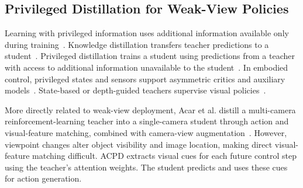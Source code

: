 

\subsection{Privileged Distillation for Weak-View Policies}

Learning with privileged information uses additional information available only during training~\cite{vapnik2015lupi}. Knowledge distillation transfers teacher predictions to a student~\cite{hinton2015distilling}. Privileged distillation trains a student using predictions from a teacher with access to additional information unavailable to the student~\cite{lopezpaz2016generalized}. In embodied control, privileged states and sensors support asymmetric critics and auxiliary models~\cite{pinto2018asymmetric,hu2024scaffolder}. State-based or depth-guided teachers supervise visual policies~\cite{xu2024humanvla,wang2025monolift}.

More directly related to weak-view deployment, Acar et al. distill a multi-camera reinforcement-learning teacher into a single-camera student through action and visual-feature matching, combined with camera-view augmentation~\cite{acar2024multicamera}. However, viewpoint changes alter object visibility and image location, making direct visual-feature matching difficult. ACPD extracts visual cues for each future control step using the teacher's attention weights. The student predicts and uses these cues for action generation.

